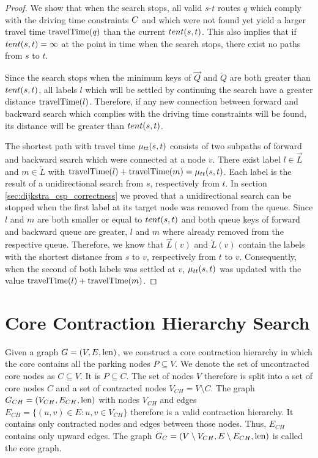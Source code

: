 \begin{proof}
	We show that when the search stops, all valid $s$-$t$ routes $q$ which comply with the driving time constraints $C$ and which were not found yet yield a larger travel time $\operatorname{travelTime}(q)$ than the current $tent(s,t)$. This also implies that if $tent(s,t) = \infty$ at the point in time when the search stops, there exist no paths from $s$ to $t$.

	Since the search stops when the minimum keys of $\overrightarrow{Q}$ and $\overleftarrow{Q}$ are both greater than $tent(s,t)$, all labels $l$ which will be settled by continuing the search have a greater distance $\operatorname{travelTime}(l)$. Therefore, if any new connection between forward and backward search which complies with the driving time constraints will be found, its distance will be greater than $tent(s,t)$.

	The shortest path with travel time $\mu_{tt}(s,t)$ consists of two subpaths of forward and backward search which were connected at a node $v$. There exist label $l \in \overrightarrow{L}$ and $m \in \overleftarrow{L}$ with $\operatorname{travelTime}(l) + \operatorname{travelTime}(m) = \mu_{tt}(s,t)$. Each label is the result of a unidirectional search from $s$, respectively from $t$. In section \ref{sec:dijkstra_csp_correctness} we proved that a unidirectional search can be stopped when the first label at its target node was removed from the queue. Since $l$ and $m$ are both smaller or equal to $tent(s,t)$ and both queue keys of forward and backward queue are greater, $l$ and $m$ where already removed from the respective queue. Therefore, we know that $\overrightarrow{L}(v)$ and $\overleftarrow{L}(v)$ contain the labels with the shortest distance from $s$ to $v$, respectively from $t$ to $v$. Consequently, when the second of both labels was settled at $v$, $\mu_{tt}(s,t)$ was updated with the value $\operatorname{travelTime}(l) + \operatorname{travelTime}(m)$.
\end{proof}

\section{Core Contraction Hierarchy Search}
Given a graph $G = (V,E,\operatorname{len})$, we construct a core contraction hierarchy in which the core contains all the parking nodes $P \subseteq V$. We denote the set of uncontracted core nodes as $C \subseteq V$. It is $P \subseteq C$. The set of nodes $V$ therefore is split into a set of core nodes $C$ and a set of contracted nodes $V_{CH} = V \setminus C$. The graph $G_{CH} = (V_{CH},E_{CH},\operatorname{len})$ with nodes $V_{CH}$ and edges $E_{CH} = \{(u,v) \in E \colon u,v \in V_{CH}\}$ therefore is a valid contraction hierarchy. It contains only contracted nodes and edges between those nodes. Thus, $E_{CH}$ contains only upward edges. The graph $G_{C} = (V \setminus V_{CH},E \setminus E_{CH},\operatorname{len})$ is called the core graph.

